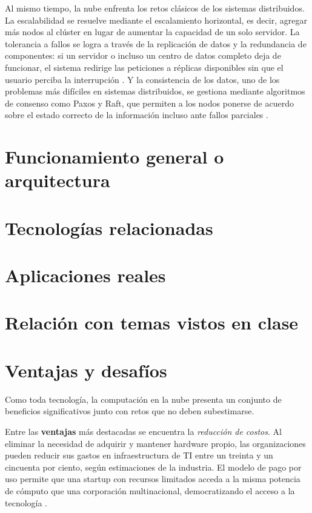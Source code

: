\documentclass[letterpaper,11pt]{article}
\begin{document}
    Al mismo tiempo, la nube enfrenta los retos clásicos de los sistemas distribuidos. La escalabilidad se resuelve mediante el escalamiento horizontal, es decir, agregar más nodos al clúster en lugar de aumentar la capacidad de un solo servidor. La tolerancia a fallos se logra a través de la replicación de datos y la redundancia de componentes: si un servidor o incluso un centro de datos completo deja de funcionar, el sistema redirige las peticiones a réplicas disponibles sin que el usuario perciba la interrupción \parencite{researchgate-faulttolerant}. Y la consistencia de los datos, uno de los problemas más difíciles en sistemas distribuidos, se gestiona mediante algoritmos de consenso como Paxos y Raft, que permiten a los nodos ponerse de acuerdo sobre el estado correcto de la información incluso ante fallos parciales \parencite{wiki-consensus}.

    \newpage
    \section{Funcionamiento general o arquitectura}


    \newpage
    \section{Tecnologías relacionadas}

    \newpage
    \section{Aplicaciones reales}

    \newpage
    \section{Relación con temas vistos en clase}

    \newpage
    \section{Ventajas y desafíos}

    Como toda tecnología, la computación en la nube presenta un conjunto de beneficios significativos junto con retos que no deben subestimarse.

    Entre las \textbf{ventajas} más destacadas se encuentra la \textit{reducción de costos}. Al eliminar la necesidad de adquirir y mantener hardware propio, las organizaciones pueden reducir sus gastos en infraestructura de TI entre un treinta y un cincuenta por ciento, según estimaciones de la industria. El modelo de pago por uso permite que una startup con recursos limitados acceda a la misma potencia de cómputo que una corporación multinacional, democratizando el acceso a la tecnología \parencite{clearfuze-pros-cons}.
\end{document}
